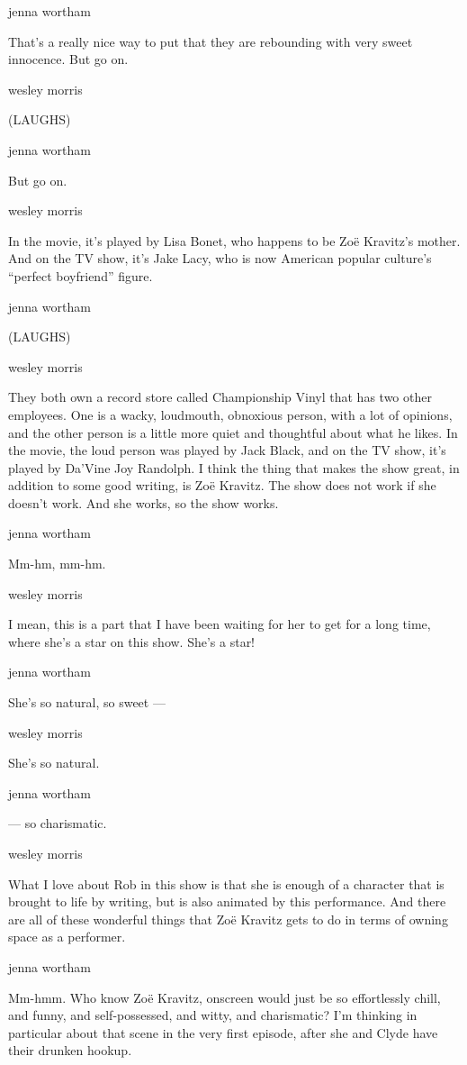 jenna wortham

That's a really nice way to put that they are rebounding with very sweet
innocence. But go on.

wesley morris

(LAUGHS)

jenna wortham

But go on.

wesley morris

In the movie, it's played by Lisa Bonet, who happens to be Zoë Kravitz's
mother. And on the TV show, it's Jake Lacy, who is now American popular
culture's ``perfect boyfriend'' figure.

jenna wortham

(LAUGHS)

wesley morris

They both own a record store called Championship Vinyl that has two
other employees. One is a wacky, loudmouth, obnoxious person, with a lot
of opinions, and the other person is a little more quiet and thoughtful
about what he likes. In the movie, the loud person was played by Jack
Black, and on the TV show, it's played by Da'Vine Joy Randolph. I think
the thing that makes the show great, in addition to some good writing,
is Zoë Kravitz. The show does not work if she doesn't work. And she
works, so the show works.

jenna wortham

Mm-hm, mm-hm.

wesley morris

I mean, this is a part that I have been waiting for her to get for a
long time, where she's a star on this show. She's a star!

jenna wortham

She's so natural, so sweet ---

wesley morris

She's so natural.

jenna wortham

--- so charismatic.

wesley morris

What I love about Rob in this show is that she is enough of a character
that is brought to life by writing, but is also animated by this
performance. And there are all of these wonderful things that Zoë
Kravitz gets to do in terms of owning space as a performer.

jenna wortham

Mm-hmm. Who know Zoë Kravitz, onscreen would just be so effortlessly
chill, and funny, and self-possessed, and witty, and charismatic? I'm
thinking in particular about that scene in the very first episode, after
she and Clyde have their drunken hookup.

